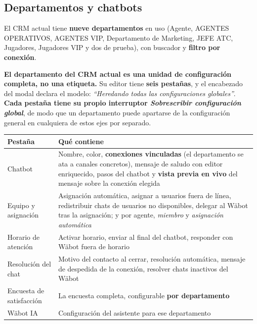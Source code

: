 \documentclass[11pt,a4paper]{article}
\begin{document}
\subsection{Departamentos y chatbots}

El CRM actual tiene \textbf{nueve departamentos} en uso (Agente, AGENTES OPERATIVOS,
AGENTES VIP, Departamento de Marketing, JEFE ATC, Jugadores, Jugadores VIP y dos de
prueba), con buscador y \textbf{filtro por conexión}.

\begin{nota}
\textbf{El departamento del CRM actual es una unidad de configuración completa, no una
etiqueta.} Su editor tiene \textbf{seis pestañas}, y el encabezado del modal declara el
modelo: \emph{``Heredando todas las configuraciones globales''}. \textbf{Cada pestaña
tiene su propio interruptor \emph{Sobrescribir configuración global}}, de modo que un
departamento puede apartarse de la configuración general en cualquiera de estos ejes por
separado.
\end{nota}

\begin{center}
\begin{tabularx}{\textwidth}{@{}lL@{}}
\toprule
\textbf{Pestaña} & \textbf{Qué contiene} \\
\midrule
Chatbot & Nombre, color, \textbf{conexiones vinculadas} (el departamento se ata a canales
          concretos), mensaje de saludo con editor enriquecido, pasos del chatbot y
          \textbf{vista previa en vivo} del mensaje sobre la conexión elegida \\
Equipo y asignación & Asignación automática, asignar a usuarios fuera de línea,
          redistribuir chats de usuarios no disponibles, delegar al Wäbot tras la
          asignación; y por agente, \emph{miembro} y \emph{asignación automática} \\
Horario de atención & Activar horario, enviar al final del chatbot, responder con Wäbot
          fuera de horario \\
Resolución del chat & Motivo del contacto al cerrar, resolución automática, mensaje de
          despedida de la conexión, resolver chats inactivos del Wäbot \\
Encuesta de satisfacción & La encuesta completa, configurable \textbf{por departamento} \\
Wäbot IA & Configuración del asistente para ese departamento \\
\bottomrule
\end{tabularx}
\end{center}
\end{document}
